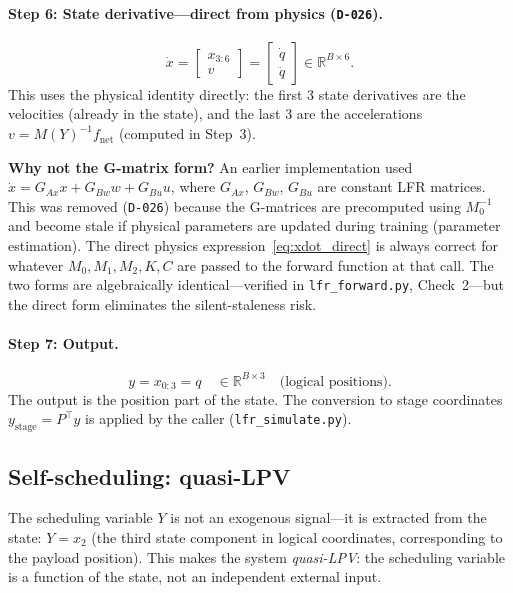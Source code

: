 \documentclass[11pt,a4paper]{article}
\newcommand{\R}{\mathbb{R}}
\newcommand{\inv}{^{-1}}
\newcommand{\T}{^{\!\top}}
\newcommand{\xdot}{\dot{x}}
\newcommand{\qdot}{\dot{q}}
\newcommand{\qddot}{\ddot{q}}
\newcommand{\decref}[1]{\texttt{D-#1}}
\newcommand{\pyfile}[1]{\texttt{#1}}
\begin{document}
\paragraph{Step 6: State derivative---direct from physics (\decref{026}).}
\begin{equation}
\label{eq:xdot_direct}
\xdot = \begin{bmatrix} x_{3:6} \\ v \end{bmatrix} = \begin{bmatrix} \qdot \\ \qddot \end{bmatrix} \in \R^{B \times 6}.
\end{equation}
This uses the physical identity directly: the first 3 state derivatives are the velocities
(already in the state), and the last 3 are the accelerations $v = M(Y)\inv f_{\text{net}}$
(computed in Step~3).

\textbf{Why not the G-matrix form?} An earlier implementation used $\xdot = G_{Ax} x +
G_{Bw} w + G_{Bu} u$, where $G_{Ax}$, $G_{Bw}$, $G_{Bu}$ are constant LFR matrices.
This was removed (\decref{026}) because the G-matrices are precomputed using $M_0\inv$ and
become stale if physical parameters are updated during training (parameter estimation). The
direct physics expression~\eqref{eq:xdot_direct} is always correct for whatever $M_0, M_1,
M_2, K, C$ are passed to the forward function at that call. The two forms are algebraically
identical---verified in \pyfile{lfr\_forward.py}, Check~2---but the direct form eliminates
the silent-staleness risk.

\paragraph{Step 7: Output.}
\begin{equation}
y = x_{0:3} = q \quad \in \R^{B \times 3} \quad \text{(logical positions)}.
\end{equation}
The output is the position part of the state. The conversion to stage coordinates
$y_{\text{stage}} = P\T y$ is applied by the caller (\pyfile{lfr\_simulate.py}).

\subsection{Self-scheduling: quasi-LPV}
\label{sec:self_scheduling}

The scheduling variable $Y$ is not an exogenous signal---it is extracted from the state:
$Y = x_2$ (the third state component in logical coordinates, corresponding to the payload
position). This makes the system \emph{quasi-LPV}: the scheduling variable is a function of
the state, not an independent external input.
\end{document}
